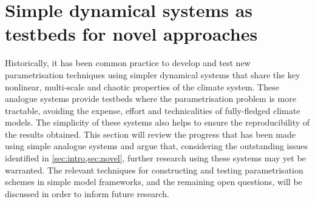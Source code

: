 \documentclass[titlepage,twoside]{article}
\numberwithin{equation}{section}
\begin{document}
\clearpage
\section{Simple dynamical systems as testbeds for novel approaches}%
\label{sec:simple}
Historically, it has been common practice to develop and test new
parametrisation techniques using simpler dynamical systems that share the key
nonlinear, multi-scale and chaotic properties of the climate system. These
analogue systems provide testbeds where the parametrisation problem is more
tractable, avoiding the expense, effort and technicalities of fully-fledged
climate models. The simplicity of these systems also helps to ensure the
reproducibility of the results obtained. This section will review the progress
that has been made using simple analogue systems and argue that, considering
the outstanding issues identified in \cref{sec:intro,sec:novel}, further
research using these systems may yet be warranted. The relevant techniques for
constructing and testing parametrisation schemes in simple model frameworks,
and the remaining open questions, will be discussed in order to inform future
research.

\end{document}
